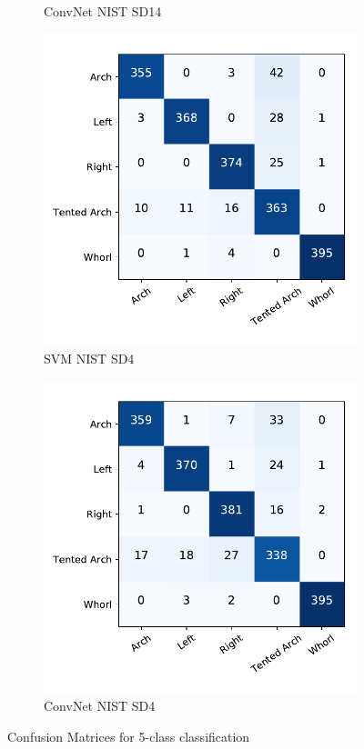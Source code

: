 \begin{figure}[!ht]
\begin{subfigure}[b]{0.25\textwidth}
		\caption{ConvNet NIST SD14 }
		\label{fig.cnf_matrix_5class.net_sd14}
	\end{subfigure}%
	\begin{subfigure}[b]{0.25\textwidth}
		\centering
		\includegraphics[width=\linewidth]{fig/figs/confusion_matrix_svm_sd4.pdf}
		\caption{SVM NIST SD4 }
		\label{fig.cnf_matrix_5class.svm_sd4}
	\end{subfigure}%
	\begin{subfigure}[b]{0.25\textwidth}
		\centering
		\includegraphics[width=\linewidth]{fig/figs/confusion_matrix_net_sd4.pdf}
		\caption{ConvNet NIST SD4 }
		\label{fig.cnf_matrix_5class.net_sd4}
	\end{subfigure}
	\caption{Confusion Matrices for 5-class classification}\label{fig.cnf_matrix_5class}
\end{figure}

